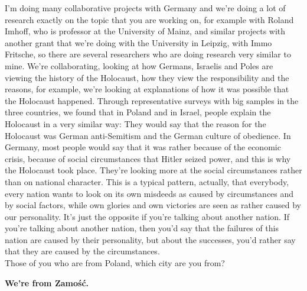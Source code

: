 I'm doing many collaborative projects with Germany and we're doing a lot of research exactly on the topic that you are working on, for example with Roland Imhoff, who is professor at the University of Mainz, and similar projects with another grant that we're doing with the University in Leipzig, with Immo Fritsche, so there are several researchers who are doing research very similar to mine. We're collaborating, looking at how Germans, Israelis and Poles are viewing the history of the Holocaust, how they view the responsibility and the reasons, for example, we're looking at explanations of how it was possible that the Holocaust happened. Through representative surveys with big samples in the three countries, we found that in Poland and in Israel, people explain the Holocaust in a very similar way: They would say that the reason for the Holocaust was German anti-Semitism and the German culture of obedience. In Germany, most people would say that it was rather because of the economic crisis, because of social circumstances that Hitler seized power, and this is why the Holocaust took place. They're looking more at the social circumstances rather than on national character. This is a typical pattern, actually, that everybody, every nation wants to look on its own misdeeds as caused by circumstances and by social factors, while own glories and own victories are seen as rather caused by our personality. It's just the opposite if you're talking about another nation. If you're talking about another nation, then you'd say that the failures of this nation are caused by their personality, but about the successes, you'd rather say that they are caused by the circumstances.\\
Those of you who are from Poland, which city are you from? 

\textbf{We're from Zamość.}

